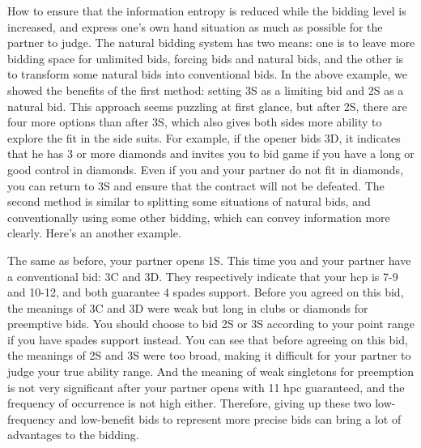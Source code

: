 \documentclass[11pt]{article}
\begin{document}
How to ensure that the information entropy is reduced while the bidding level is increased, and express one’s own hand situation as much as possible for the partner to judge. The natural bidding system has two means: one is to leave more bidding space for unlimited bids, forcing bids and natural bids, and the other is to transform some natural bids into conventional bids. In the above example, we showed the benefits of the first method: setting 3S as a limiting bid and 2S as a natural bid. This approach seems puzzling at first glance, but after 2S, there are four more options than after 3S, which also gives both sides more ability to explore the fit in the side suits. For example, if the opener bids 3D, it indicates that he has 3 or more diamonds and invites you to bid game if you have a long or good control in diamonds. Even if you and your partner do not fit in diamonds, you can return to 3S and ensure that the contract will not be defeated. The second method is similar to splitting some situations of natural bids, and conventionally using some other bidding, which can convey information more clearly. Here's an another example.

The same as before, your partner opens 1S. This time you and your partner have a conventional bid: 3C and 3D. They respectively indicate that your hcp is 7-9 and 10-12, and both guarantee 4 spades support. Before you agreed on this bid, the meanings of 3C and 3D were weak but long in clubs or diamonds for preemptive bids. You should choose to bid 2S or 3S according to your point range if you have spades support instead. You can see that before agreeing on this bid, the meanings of 2S and 3S were too broad, making it difficult for your partner to judge your true ability range. And the meaning of weak singletons for preemption is not very significant after your partner opens with 11 hpc guaranteed, and the frequency of occurrence is not high either. Therefore, giving up these two low-frequency and low-benefit bids to represent more precise bids can bring a lot of advantages to the bidding.
\end{document}
